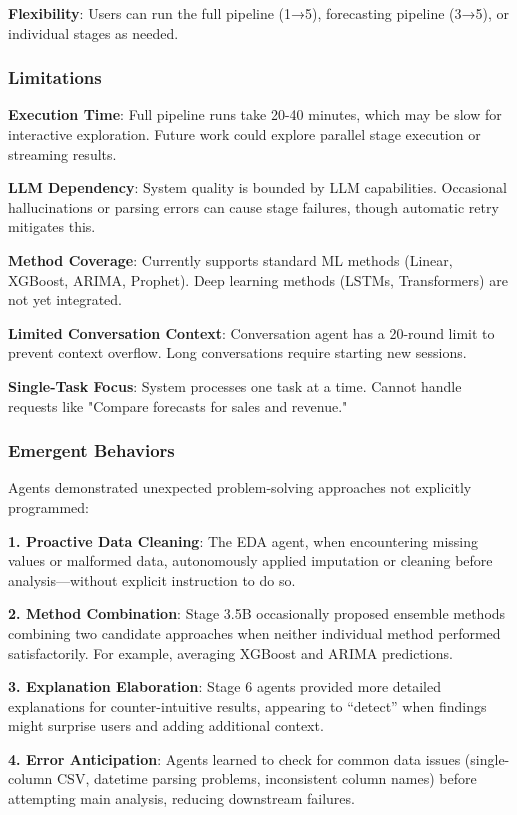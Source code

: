 \documentclass[11pt,a4paper]{article}
\begin{document}
\textbf{Flexibility}: Users can run the full pipeline (1→5), forecasting pipeline (3→5), or individual stages as needed.

\subsubsection{Limitations}

\textbf{Execution Time}: Full pipeline runs take 20-40 minutes, which may be slow for interactive exploration. Future work could explore parallel stage execution or streaming results.

\textbf{LLM Dependency}: System quality is bounded by LLM capabilities. Occasional hallucinations or parsing errors can cause stage failures, though automatic retry mitigates this.

\textbf{Method Coverage}: Currently supports standard ML methods (Linear, XGBoost, ARIMA, Prophet). Deep learning methods (LSTMs, Transformers) are not yet integrated.

\textbf{Limited Conversation Context}: Conversation agent has a 20-round limit to prevent context overflow. Long conversations require starting new sessions.

\textbf{Single-Task Focus}: System processes one task at a time. Cannot handle requests like "Compare forecasts for sales and revenue."

\subsubsection{Emergent Behaviors}

Agents demonstrated unexpected problem-solving approaches not explicitly programmed:

\textbf{1. Proactive Data Cleaning}:
The EDA agent, when encountering missing values or malformed data, autonomously applied imputation or cleaning before analysis---without explicit instruction to do so.

\textbf{2. Method Combination}:
Stage 3.5B occasionally proposed ensemble methods combining two candidate approaches when neither individual method performed satisfactorily. For example, averaging XGBoost and ARIMA predictions.

\textbf{3. Explanation Elaboration}:
Stage 6 agents provided more detailed explanations for counter-intuitive results, appearing to ``detect'' when findings might surprise users and adding additional context.

\textbf{4. Error Anticipation}:
Agents learned to check for common data issues (single-column CSV, datetime parsing problems, inconsistent column names) before attempting main analysis, reducing downstream failures.
\end{document}
